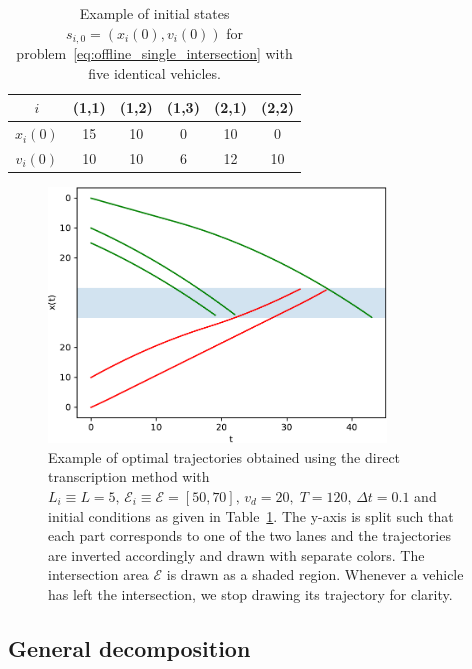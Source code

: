 \documentclass[a4paper]{article}
\theoremstyle{definition}
\theoremstyle{plain}
\begin{document}
\begin{table}[H]
  \centering
\begin{tabular}{ c | c c c | c c }
  $i$  & {\color{armygreen}(1,1)} & {\color{armygreen}(1,2)} & {\color{armygreen}(1,3)} & {\color{red}(2,1)} & {\color{red}(2,2)} \\
  \hline
  $x_{i}(0)$ & 15 & 10 &  0 & 10 &  0 \\
  $v_{i}(0)$ & 10 & 10 &  6 & 12 & 10 \\
\end{tabular}
\caption{Example of initial states $s_{i,0} = (x_{i}(0), v_{i}(0))$ for
  problem~\eqref{eq:offline_single_intersection} with five identical vehicles.}
\label{tab:hult_parameters}
\end{table}

\begin{figure}[H]
  \centering
  \includegraphics[width=0.8\textwidth]{figures/single/trajectories_general.pdf}
  \caption{Example of optimal trajectories obtained using the direct
    transcription method with
    $L_{i} \equiv L = 5, \, \mathcal{E}_{i} \equiv \mathcal{E} = [50, 70], \, v_{d} = 20, \; T=120, \, \Delta t = 0.1$
    and initial conditions as given in Table~\ref{tab:hult_parameters}. The
    y-axis is split such that each part corresponds to one of the two lanes and
    the trajectories are inverted accordingly and drawn with separate colors.
    The intersection area $\mathcal{E}$ is drawn as a shaded region. Whenever a
    vehicle has left the intersection, we stop drawing its trajectory for
    clarity.}
  \label{fig:direct_transcription_example}
\end{figure}


\subsection{General decomposition}
\end{document}
